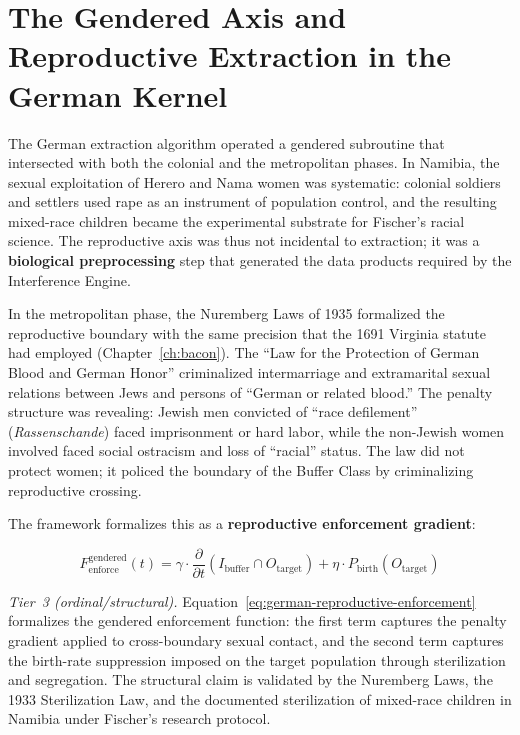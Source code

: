 \section{The Gendered Axis and Reproductive Extraction in the German Kernel}
\label{sec:german_gendered}

The German extraction algorithm operated a gendered subroutine that intersected with both the colonial and the metropolitan phases. In Namibia, the sexual exploitation of Herero and Nama women was systematic: colonial soldiers and settlers used rape as an instrument of population control, and the resulting mixed-race children became the experimental substrate for Fischer's racial science. The reproductive axis was thus not incidental to extraction; it was a \textbf{biological preprocessing} step that generated the data products required by the Interference Engine.

In the metropolitan phase, the Nuremberg Laws of 1935 formalized the reproductive boundary with the same precision that the 1691 Virginia statute had employed (Chapter~\ref{ch:bacon}). The ``Law for the Protection of German Blood and German Honor'' criminalized intermarriage and extramarital sexual relations between Jews and persons of ``German or related blood.'' The penalty structure was revealing: Jewish men convicted of ``race defilement'' (\textit{Rassenschande}) faced imprisonment or hard labor, while the non-Jewish women involved faced social ostracism and loss of ``racial'' status. The law did not protect women; it policed the boundary of the Buffer Class by criminalizing reproductive crossing.

The framework formalizes this as a \textbf{reproductive enforcement gradient}:

\begin{equation}\label{eq:german-reproductive-enforcement}
F_{\text{enforce}}^{\text{gendered}}(t) = \gamma \cdot \frac{\partial}{\partial t} \left( I_{\text{buffer}} \cap O_{\text{target}} \right) + \eta \cdot P_{\text{birth}}(O_{\text{target}})
\end{equation}

\noindent\textit{Tier~3 (ordinal/structural).} Equation~\ref{eq:german-reproductive-enforcement} formalizes the gendered enforcement function: the first term captures the penalty gradient applied to cross-boundary sexual contact, and the second term captures the birth-rate suppression imposed on the target population through sterilization and segregation. The structural claim is validated by the Nuremberg Laws, the 1933 Sterilization Law, and the documented sterilization of mixed-race children in Namibia under Fischer's research protocol.

